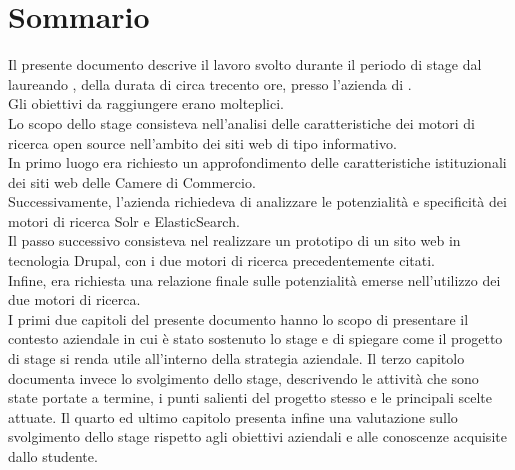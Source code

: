 
\cleardoublepage
{}
{}
\begingroup
\let\clearpage\relax
\let\cleardoublepage\relax
\let\cleardoublepage\relax

\chapter*{Sommario}

Il presente documento descrive il lavoro svolto durante il periodo di stage dal laureando \autore, della durata di circa trecento ore, presso l'azienda \nomeAzienda di \locazioneAzienda. \\
Gli obiettivi da raggiungere erano molteplici. \\
Lo scopo dello stage consisteva nell'analisi delle caratteristiche dei motori di ricerca \gls{open source} nell'ambito dei siti web di tipo informativo.\\
In primo luogo era richiesto un approfondimento delle caratteristiche istituzionali dei siti web delle Camere di Commercio. \\
Successivamente, l'azienda richiedeva di analizzare le potenzialità e specificità dei motori di ricerca \gls{Solr} e \gls{ElasticSearch}. \\
Il passo successivo consisteva nel realizzare un prototipo di un sito web in tecnologia \gls{Drupal}, con i due motori di ricerca precedentemente citati. \\
Infine, era richiesta una relazione finale sulle potenzialità emerse nell'utilizzo dei due motori di ricerca. \\
I primi due capitoli del presente documento hanno lo scopo di presentare il contesto aziendale in cui è stato sostenuto lo stage e di spiegare come il progetto di stage si renda utile all’interno della strategia aziendale. Il terzo capitolo documenta invece lo svolgimento dello stage, descrivendo le attività che sono state portate a termine, i punti salienti del progetto stesso e le principali scelte attuate. Il quarto ed ultimo capitolo presenta infine una valutazione sullo svolgimento dello stage rispetto agli obiettivi aziendali e alle conoscenze acquisite dallo studente.


\endgroup

\vfill